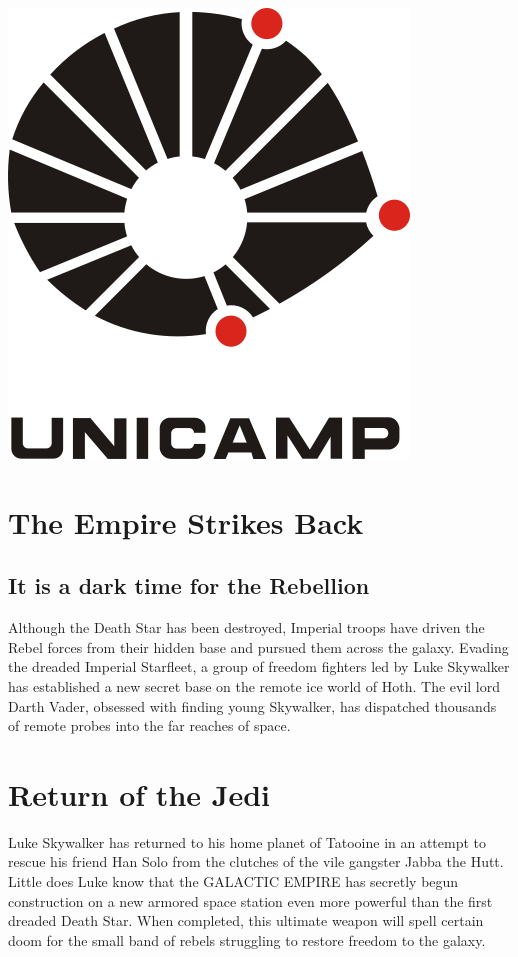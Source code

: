 \documentclass[oneside]{ifgw}
\begin{document}
\lipsum[1-4]


\begin{center}
\includegraphics[width=.35\textwidth]{Images/unicamp.png}
\end{center}

\lipsum[5-10]

\chapter{The Empire Strikes Back}

\section{It is a dark time for the Rebellion}
 
Although the Death Star has been destroyed, Imperial troops have driven the Rebel forces from their hidden base and pursued them across the galaxy.  Evading the dreaded Imperial Starfleet, a group of freedom fighters led by Luke Skywalker has established a new secret base on the remote ice world of Hoth.  The evil lord Darth Vader, obsessed with finding young Skywalker, has dispatched thousands of remote probes into the far reaches of space.

\lipsum[1-10]

\chapter{Return of the Jedi}

Luke Skywalker has returned to his home planet of Tatooine in an attempt to rescue his friend Han Solo from the clutches of the vile gangster Jabba the Hutt.  Little does Luke know that the GALACTIC EMPIRE has secretly begun construction on a new armored space station even more powerful than the first dreaded Death Star.  When completed, this ultimate weapon will spell certain doom for the small band of rebels struggling to restore freedom to the galaxy.
\end{document}

